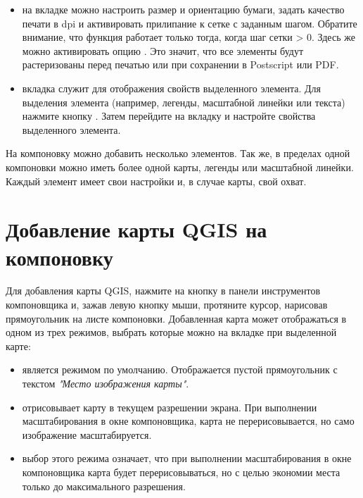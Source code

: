 \begin{itemize}[label=--]
\item на вкладке  можно настроить размер и ориентацию бумаги,
задать качество печати в dpi и активировать прилипание к сетке с заданным
шагом. Обратите внимание, что функция 
работает только тогда, когда шаг сетки > 0. Здесь же можно активировать
опцию . Это значит, что все элементы будут
растеризованы перед печатью или при сохранении в Postscript или PDF.
\item вкладка  служит для отображения свойств выделенного
элемента. Для выделения элемента (например, легенды, масштабной линейки
или текста) нажмите кнопку . Затем перейдите на вкладку  и настройте свойства
выделенного элемента.
\end{itemize}

На компоновку можно добавить несколько элементов. Так же, в пределах
одной компоновки можно иметь более одной карты, легенды или масштабной
линейки. Каждый элемент имеет свои настройки и, в случае карты, свой
охват.

\section{Добавление карты QGIS на компоновку}

Для добавления карты QGIS, нажмите на кнопку
 в панели инструментов
компоновщика и, зажав левую кнопку мыши, протяните курсор, нарисовав
прямоугольник на листе компоновки. Добавленная карта может отображаться
в одном из трех режимов, выбрать которые можно на вкладке 
при выделенной карте:

\begin{itemize}[label=--]
\item {} является режимом по
умолчанию. Отображается пустой прямоугольник с текстом
\textit{"Место изображения карты"}.
\item {} отрисовывает карту в текущем
разрешении экрана. При выполнении масштабирования в окне компоновщика,
карта не перерисовывается, но само изображение масштабируется.
\item {} выбор этого режима
означает, что при выполнении масштабирования в окне компоновщика карта
будет перерисовываться, но с целью экономии места только до
максимального разрешения.
\end{itemize}

